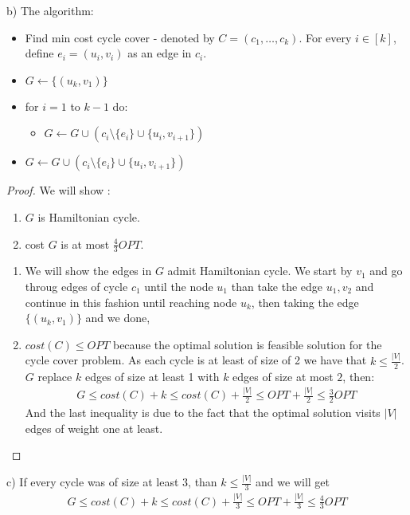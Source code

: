\documentclass{article}
\begin{document}
\begin{enumerate}
b) The algorithm:
\begin{itemize}
	\item Find min cost cycle cover - denoted by $C = (c_1,\ldots,c_k)$. For every $i \in [k]$, define $e_i = (u_i,v_i)$ as an edge in $c_i$.
	\item $G\leftarrow \{(u_k,v_1)\}$
	\item for $i=1$ to $k-1$ do:
	\begin{itemize}
		\item $G \leftarrow G \cup (c_i \setminus \{e_i\} \cup \{u_i,v_{i+1}\})$
	\end{itemize}
	\item $G \leftarrow G \cup (c_i \setminus \{e_i\} \cup \{u_i,v_{i+1}\})$
\end{itemize}
\begin{proof}
We will show :
\begin{enumerate}[I]
	\item $G$ is Hamiltonian cycle. 
	\item cost $G$ is at most $\frac{4}{3}OPT$. 
\end{enumerate}
\begin{enumerate}[I]
	\item We will show the edges in $G$ admit Hamiltonian cycle. We start by $v_1$ and go throug edges of cycle $c_1$ until the node $u_1$ than take the edge $u_1,v_2$ and continue in this fashion until reaching node $u_k$, then taking the edge $\{(u_k,v_1)\}$ and we done,
	\item $cost(C) \le OPT$ because the optimal solution is feasible solution for the cycle cover problem. 
	As each cycle is at least of size of 2 we have that $k\le \frac{|V|}{2}$. $G$ replace $k$ edges of size at least 1 with $k$ edges of size at most $2$, then:
	\begin{align*}
	G \le cost(C) + k \le cost(C) + \frac{|V|}{2} \le OPT +\frac{|V|}{2} \le \frac{3}{2}OPT
	\end{align*}
	And the last inequality is due to the fact that the optimal solution visits $|V|$ edges of weight one at least. 
	
\end{enumerate}	
\end{proof}

c) If every cycle was of size at least 3, than $k \le \frac{|V|}{3}$ and we will get
	\begin{align*}
	G \le cost(C) + k \le cost(C) + \frac{|V|}{3} \le OPT +\frac{|V|}{3} \le \frac{4}{3}OPT
	\end{align*}


\end{enumerate}
\end{document}
